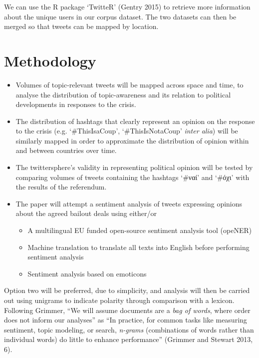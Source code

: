 \documentclass[]{article}
\begin{document}
We can use the R package `TwitteR' (Gentry 2015) to retrieve more
information about the unique users in our corpus dataset. The two
datasets can then be merged so that tweets can be mapped by location.

\section{Methodology}\label{methodology}

\begin{itemize}
\item
  Volumes of topic-relevant tweets will be mapped across space and time,
  to analyse the distribution of topic-awareness and its relation to
  political developments in responses to the crisis.
\item
  The distribution of hashtags that clearly represent an opinion on the
  response to the crisis (e.g. `\#ThisIsaCoup', `\#ThisIsNotaCoup'
  \emph{inter alia}) will be similarly mapped in order to approximate
  the distribution of opinion within and between countries over time.
\item
  The twittersphere's validity in representing political opinion will be
  tested by comparing volumes of tweets containing the hashtags `\#ναί'
  and `\#όχι' with the results of the referendum.
\item
  The paper will attempt a sentiment analysis of tweets expressing
  opinions about the agreed bailout deals using either/or

  \begin{itemize}
  \item
    A multilingual EU funded open-source sentiment analysis tool
    (opeNER)
  \item
    Machine translation to translate all texts into English before
    performing sentiment analysis
  \item
    Sentiment analysis based on emoticons
  \end{itemize}
\end{itemize}

Option two will be preferred, due to simplicity, and analysis will then
be carried out using unigrams to indicate polarity through comparison
with a lexicon. Following Grimmer, ``We will assume documents are a
\emph{bag of words}, where order does not inform our analyses'' as ``In
practice, for common tasks like measuring sentiment, topic modeling, or
search, \emph{n-grams} (combinations of words rather than individual
words) do little to enhance performance'' (Grimmer and Stewart 2013, 6).
\end{document}
